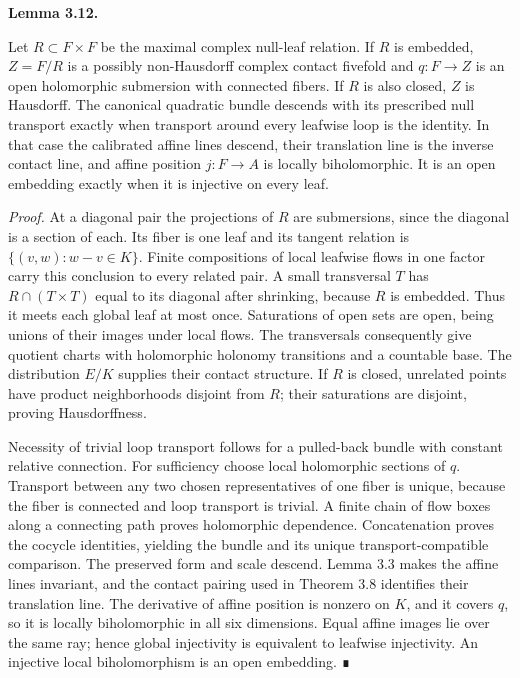 \documentclass[
  english,
  11pt,
  reqno]{amsart}
\makeatletter
\newcommand{\pandocstatementheading}[1]{%
  \par\addpenalty{\@beginparpenalty}%
  \addvspace{.5\baselineskip plus .2\baselineskip minus .2\baselineskip}%
  {\normalfont\bfseries #1\par}%
  \nobreak\@afterindenttrue\@afterheading
}
\makeatother
\begin{document}
\pandocstatementheading{\protect{}\label{lem:ordinary-null-quotient-v08}Lemma 3.12.}

Let \(R\subset F\times F\) be the maximal complex null-leaf relation. If
\(R\) is embedded, \(Z=F/R\) is a possibly non-Hausdorff complex contact
fivefold and \(q:F\to Z\) is an open holomorphic submersion with
connected fibers. If \(R\) is also closed, \(Z\) is Hausdorff. The
canonical quadratic bundle descends with its prescribed null transport
exactly when transport around every leafwise loop is the identity. In
that case the calibrated affine lines descend, their translation line is
the inverse contact line, and affine position \(j:F\to A\) is locally
biholomorphic. It is an open embedding exactly when it is injective on
every leaf.

\emph{Proof.} At a diagonal pair the projections of \(R\) are
submersions, since the diagonal is a section of each. Its fiber is one
leaf and its tangent relation is \(\{(v,w):w-v\in K\}\). Finite
compositions of local leafwise flows in one factor carry this conclusion
to every related pair. A small transversal \(T\) has
\(R\cap(T\times T)\) equal to its diagonal after shrinking, because
\(R\) is embedded. Thus it meets each global leaf at most once.
Saturations of open sets are open, being unions of their images under
local flows. The transversals consequently give quotient charts with
holomorphic holonomy transitions and a countable base. The distribution
\(E/K\) supplies their contact structure. If \(R\) is closed, unrelated
points have product neighborhoods disjoint from \(R\); their saturations
are disjoint, proving Hausdorffness.

Necessity of trivial loop transport follows for a pulled-back bundle
with constant relative connection. For sufficiency choose local
holomorphic sections of \(q\). Transport between any two chosen
representatives of one fiber is unique, because the fiber is connected
and loop transport is trivial. A finite chain of flow boxes along a
connecting path proves holomorphic dependence. Concatenation proves the
cocycle identities, yielding the bundle and its unique
transport-compatible comparison. The preserved form and scale descend.
Lemma 3.3 makes the affine lines invariant, and the contact pairing used
in Theorem 3.8 identifies their translation line. The derivative of
affine position is nonzero on \(K\), and it covers \(q\), so it is
locally biholomorphic in all six dimensions. Equal affine images lie
over the same ray; hence global injectivity is equivalent to leafwise
injectivity. An injective local biholomorphism is an open embedding. ∎
\end{document}
